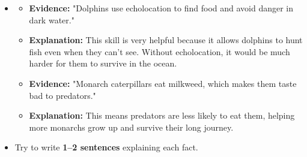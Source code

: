 \documentclass[12pt]{article}
\begin{document}
\begin{tcolorbox}[colframe=black!60, colback=white, 
coltitle=black, colbacktitle=black!15, fonttitle=\bfseries\Large, 
title=Examples, halign title=center, left=10pt, right=10pt, top=10pt, bottom=15pt]
\begin{itemize}
\begin{itemize}
      \item  \begin{itemize}
            \item \textbf{Evidence:} "Dolphins use echolocation to find food and avoid danger in dark water."
            \item \textbf{Explanation:} This skill is very helpful because it allows dolphins to hunt fish even when they can’t see. Without echolocation, it would be much harder for them to survive in the ocean.
            \item \textbf{Evidence:} "Monarch caterpillars eat milkweed, which makes them taste bad to predators."
            \item \textbf{Explanation:} This means predators are less likely to eat them, helping more monarchs grow up and survive their long journey.
        \end{itemize}
        \item Try to write \textbf{1--2 sentences} explaining each fact.
    \end{itemize}
\end{itemize}






       

     






 


     \end{tcolorbox}
\vspace{1em}
\end{document}
